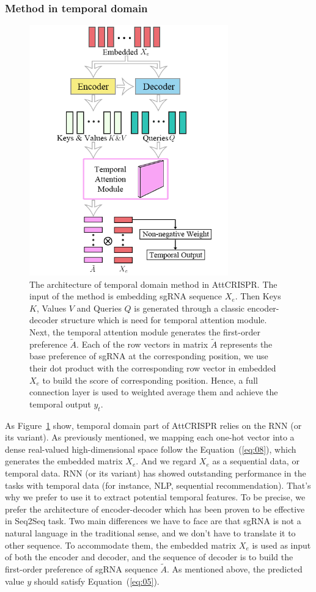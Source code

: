 \documentclass{bioinfo}
\begin{document}
\subsubsection{Method in temporal domain}
\begin{figure}[tpb]%
    \centerline{\includegraphics[width=86mm]{temporalmodule.png}}
    \caption{The architecture of temporal domain method in AttCRISPR. 
    The input of the method is embedding sgRNA sequence $X_e$. 
    Then Keys $K$, Values $V$ and Queries $Q$ is generated through a classic encoder-decoder structure which is need for temporal attention module.
    Next, the temporal attention module generates the first-order preference $\tilde{A}$. 
    Each of the row vectors in matrix $\tilde{A}$ represents the base preference of sgRNA at the corresponding position, we use their dot product with the corresponding row vector in embedded $X_e$ to build the score of corresponding position. 
    Hence, a full connection layer is used to weighted average them and achieve the temporal output $y_t$.
    }\label{fig:04}
\end{figure}

As Figure~\ref{fig:04} show, temporal domain part of AttCRISPR relies on the RNN (or its variant). 
As previously mentioned, we mapping each one-hot vector into a dense real-valued high-dimensional space follow the Equation~(\ref{eq:08}), which generates the embedded matrix $X_e$.
And we regard $X_{e}$ as a sequential data, or temporal data.
RNN (or its variant) has showed outstanding performance in the tasks with temporal data (for instance, NLP, sequential recommendation). 
That's why we prefer to use it to extract potential temporal features. 
To be precise, we prefer the architecture of encoder-decoder which has been proven to be effective in Seq2Seq task. 
Two main differences we have to face are that sgRNA is not a natural language in the traditional sense, and we don't have to translate it to other sequence. 
To accommodate them, the embedded matrix $X_e$ is used as input of both the encoder and decoder, and the sequence of decoder is to build the first-order preference of sgRNA sequence $\tilde{A}$. 
As mentioned above, the predicted value $y$ should satisfy Equation~(\ref{eq:05}). 
\end{document}
